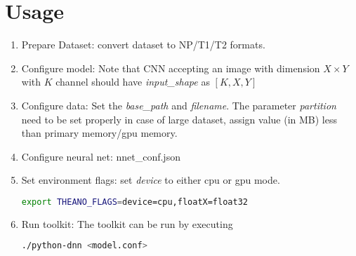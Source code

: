 \section{Usage}

\begin{enumerate}
	\item Prepare Dataset: convert dataset to NP/T1/T2 formats.
	\item Configure model: Note that CNN accepting an image with dimension $X \times Y$ with $K$ channel should have \textit{input\_shape} as $[K,X,Y]$
	\item Configure data: Set the \textit{base\_path} and \textit{filename}. The parameter \textit{partition} need to be set properly in case of large dataset, assign value (in MB) less than primary memory/gpu memory. 
	\item Configure neural net: nnet\_conf.json
	\item Set environment flags: set \textit{device} to either cpu or gpu mode.
	\begin{lstlisting}[language=bash,basicstyle=\small] 
		export THEANO_FLAGS=device=cpu,floatX=float32
	\end{lstlisting}
	\item Run toolkit: The toolkit can be run by executing
	\begin{lstlisting}[language=bash,basicstyle=\small] 
		./python-dnn <model.conf>
	\end{lstlisting}
\end{enumerate}
